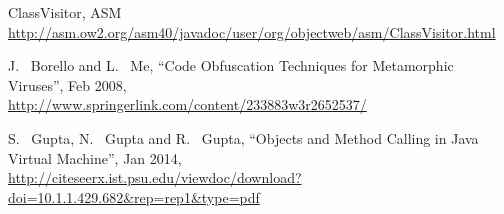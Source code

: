 \begin{thebibliography}{10}
 ClassVisitor, ASM
\url{http://asm.ow2.org/asm40/javadoc/user/org/objectweb/asm/ClassVisitor.html}

 J. ~Borello and L. ~Me, “Code Obfuscation Techniques for Metamorphic Viruses”, Feb 2008,\\
\url{http://www.springerlink.com/content/233883w3r2652537/}

 S. ~Gupta, N. ~Gupta and R. ~Gupta, “Objects and Method Calling in Java Virtual Machine”, Jan 2014,\\
\url{http://citeseerx.ist.psu.edu/viewdoc/download?doi=10.1.1.429.682&rep=rep1&type=pdf}

\end{thebibliography}

